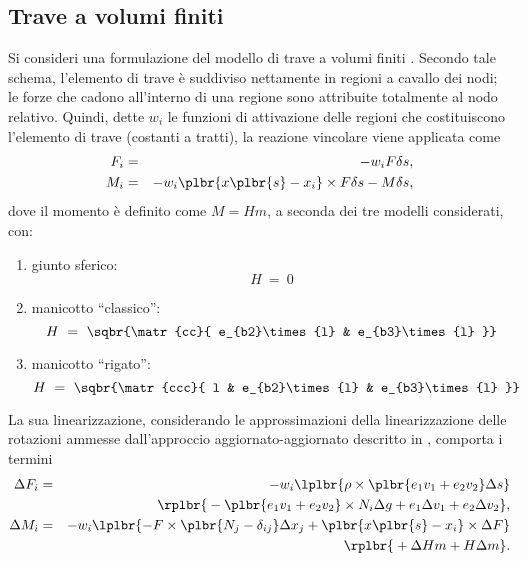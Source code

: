 \documentclass[12pt,dvips,fleqn,italian]{article}
\begin{document}
\subsection*{Trave a volumi finiti}
Si consideri una formulazione del modello di trave a volumi finiti
\cite{FV-AIAA}.
Secondo tale schema, l'elemento di trave \`{e} suddiviso nettamente in
regioni a cavallo dei nodi; le forze che cadono all'interno di una regione
sono attribuite totalmente al nodo relativo.
Quindi, dette $w_i$ le funzioni di attivazione delle regioni che
costituiscono l'elemento di trave (costanti a tratti), la reazione vincolare
viene applicata come
\begin{eqnarray*}
    F_i & = & - w_i F\delta{s} , \\
    M_i & = & - w_i \plbr{ x\plbr{s} - x_i }\times F\delta{s} 
        - M\delta{s} ,
\end{eqnarray*}
dove il momento \`e definito come $ M=Hm$, a seconda dei tre modelli 
considerati, con:
\begin{enumerate}
	\item giunto sferico:
	\begin{displaymath}
		H \ = \ 0
	\end{displaymath}
	\item manicotto ``classico'':
	\begin{displaymath}
		H \ = \ \sqbr{\matr{cc}{
			e_{b2}\times{l} & e_{b3}\times{l}
		}}
	\end{displaymath}
	\item manicotto ``rigato'':
	\begin{displaymath}
		H \ = \ \sqbr{\matr{ccc}{
			l & e_{b2}\times{l} & e_{b3}\times{l}
		}}
	\end{displaymath}
\end{enumerate}
La sua linearizzazione, considerando le approssimazioni della
linearizzazione delle rotazioni ammesse dall'approccio aggiornato-aggiornato
descritto in \cite{PHD-MASARATI}, comporta i termini
\begin{eqnarray*}
    \Delta{F_i} & = & - w_i \lplbr{
        \rho \times \plbr{ e_1 v_1 + e_2 v_2 } \Delta{s}
    } \\
    & & \rplbr{ \mbox{}
	- \plbr{ e_1 v_1 + e_2 v_2 } \times N_i \Delta{g}
	+ e_1 \Delta{v_1} + e_2 \Delta{v_2}
    } , \\
    \Delta{M_i} & = & - w_i \lplbr{
        - F \times \plbr{ N_j - \delta_{ij} }\Delta{ x_j }
	+ \plbr{ x\plbr{s} - x_i }\times \Delta{F}
    } \\
    & & \rplbr{ \mbox{}
        + \Delta{H} m + H \Delta{m}
    } .
\end{eqnarray*}
\end{document}
